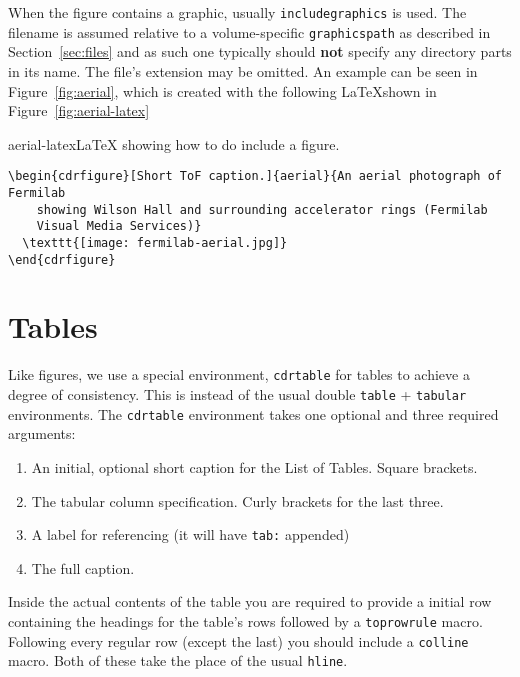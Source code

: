 When the figure contains a graphic,  usually \texttt{includegraphics} is used.
The filename is assumed relative to a volume-specific \texttt{graphicspath} as
described in Section~\ref{sec:files} and as such one typically should
\textbf{not} specify any directory parts in its name.
The file's extension may be omitted.
An example can be seen in Figure~\ref{fig:aerial}, which is created
with the following \LaTeX shown in Figure~\ref{fig:aerial-latex}

\begin{cdrfigure}{aerial-latex}{\LaTeX{} showing how to do include a figure.}
\begin{verbatim}
\begin{cdrfigure}[Short ToF caption.]{aerial}{An aerial photograph of Fermilab
    showing Wilson Hall and surrounding accelerator rings (Fermilab
    Visual Media Services)}
  \texttt{[image: fermilab-aerial.jpg]}
\end{cdrfigure}
\end{verbatim}
\end{cdrfigure}

\FloatBarrier
\section{Tables}
\label{sec:tables}

Like figures, we use a special environment, \texttt{cdrtable} for
tables to achieve a degree of consistency.
This is instead of the usual double \texttt{table} + \texttt{tabular} environments.
The \texttt{cdrtable} environment takes one optional and three
required arguments:

\begin{enumerate}
\item An initial, optional short caption for the List of Tables. Square brackets.
\item The tabular column specification. Curly brackets for the last three.
\item A label for referencing (it will have \texttt{tab:} appended)
\item The full caption.
\end{enumerate}

Inside the actual contents of the table you are required to provide a
initial row containing the headings for the table's rows followed by a
\texttt{toprowrule} macro.
Following every regular row (except the last) you should include a
\texttt{colline} macro.
Both of these take the place of the usual \texttt{hline}.

